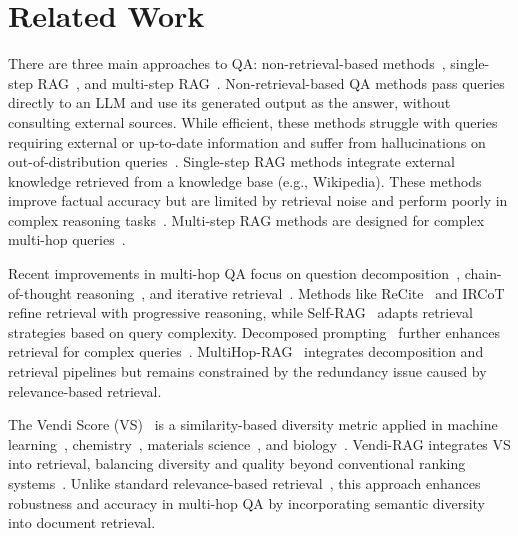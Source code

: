 \section{Related Work}
\label{sec:related}

 There are three main approaches to QA: non-retrieval-based methods~\citep{petroni2019language}, single-step RAG~\citep{lewis2020retrieval}, and multi-step RAG~\citep{asai2023self}. Non-retrieval-based QA methods pass queries directly to an LLM and use its generated output as the answer, without consulting external sources. While efficient, these methods struggle with queries requiring external or up-to-date information and suffer from hallucinations on out-of-distribution queries~\citep{shuster2021retrieval}. Single-step RAG methods integrate external knowledge retrieved from a knowledge base (e.g., Wikipedia). These methods improve factual accuracy but are limited by retrieval noise and perform poorly in complex reasoning tasks~\citep{trivedi2022interleaving}. Multi-step RAG methods are designed for complex multi-hop queries~\citep{jeong2024adaptive,asai2023self,tang2024multihop}. 

Recent improvements in multi-hop QA focus on question decomposition~\citep{radhakrishnan2023question}, chain-of-thought reasoning~\citep{wei2022chain,liu2024much}, and iterative retrieval~\citep{jeong2024adaptive,shao2023enhancing,yu2024auto}. Methods like ReCite~\citep{sun2022recitation} and IRCoT~\citep{trivedi2022interleaving} refine retrieval with progressive reasoning, while Self-RAG~\citep{asai2023self} adapts retrieval strategies based on query complexity. Decomposed prompting~\citep{khot2022decomposed} further enhances retrieval for complex queries~\citep{zhang2024accelerating}. MultiHop-RAG~\citep{tang2024multihop} integrates decomposition and retrieval pipelines but remains constrained by the redundancy issue caused by relevance-based retrieval.  

 The Vendi Score (VS)~\citep{friedman2023vendi} is a similarity-based diversity metric applied in machine learning~\citep{berns2023towards, pasarkar2023cousins, mousavi4924208vsi, nguyen2024quality, kannen2024beyond, jalali2024conditional, askari2024improving, rezaei2025alpha, bhardwaj2025robust}, chemistry~\citep{pasarkar2023vendi}, materials science~\citep{liu2024diversity}, and biology~\citep{pasarkar2025vendiscope}. Vendi-RAG integrates VS into retrieval, balancing diversity and quality beyond conventional ranking systems~\citep{carbonell1998use, slivkins2010learning}. Unlike standard relevance-based retrieval~\citep{guu2020retrieval}, this approach enhances robustness and accuracy in multi-hop QA by incorporating semantic diversity into document retrieval.